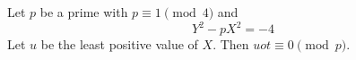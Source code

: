 \begin{proposition}\label{eq:186}
    Let $p$ be a prime with $p\equiv1\pmod4$ and
\[
    Y^2-pX^2=-4
\]
    Let $u$ be the least positive value of $X$. Then $u
    ot\equiv0\pmod p$.
\end{proposition}
